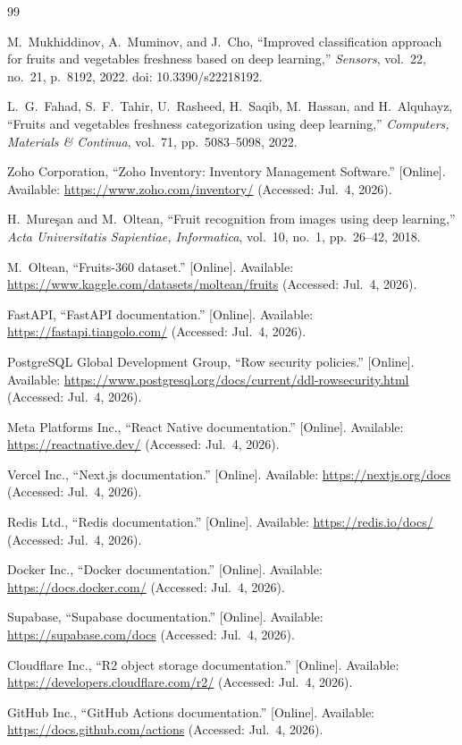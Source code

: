 \documentclass[12pt,a4paper]{article}
\begin{document}
\newpage
\begin{thebibliography}{99}

M.~Mukhiddinov, A.~Muminov, and J.~Cho, ``Improved classification approach for fruits and vegetables freshness based on deep learning,'' \emph{Sensors}, vol.~22, no.~21, p.~8192, 2022. doi: 10.3390/s22218192.

L.~G.~Fahad, S.~F.~Tahir, U.~Rasheed, H.~Saqib, M.~Hassan, and H.~Alquhayz, ``Fruits and vegetables freshness categorization using deep learning,'' \emph{Computers, Materials \& Continua}, vol.~71, pp.~5083--5098, 2022.

Zoho Corporation, ``Zoho Inventory: Inventory Management Software.'' [Online]. Available: \url{https://www.zoho.com/inventory/} (Accessed: Jul.~4, 2026).

H.~Mure\c{s}an and M.~Oltean, ``Fruit recognition from images using deep learning,'' \emph{Acta Universitatis Sapientiae, Informatica}, vol.~10, no.~1, pp.~26--42, 2018.

M.~Oltean, ``Fruits-360 dataset.'' [Online]. Available: \url{https://www.kaggle.com/datasets/moltean/fruits} (Accessed: Jul.~4, 2026).

FastAPI, ``FastAPI documentation.'' [Online]. Available: \url{https://fastapi.tiangolo.com/} (Accessed: Jul.~4, 2026).

PostgreSQL Global Development Group, ``Row security policies.'' [Online]. Available: \url{https://www.postgresql.org/docs/current/ddl-rowsecurity.html} (Accessed: Jul.~4, 2026).

Meta Platforms Inc., ``React Native documentation.'' [Online]. Available: \url{https://reactnative.dev/} (Accessed: Jul.~4, 2026).

Vercel Inc., ``Next.js documentation.'' [Online]. Available: \url{https://nextjs.org/docs} (Accessed: Jul.~4, 2026).

Redis Ltd., ``Redis documentation.'' [Online]. Available: \url{https://redis.io/docs/} (Accessed: Jul.~4, 2026).

Docker Inc., ``Docker documentation.'' [Online]. Available: \url{https://docs.docker.com/} (Accessed: Jul.~4, 2026).

Supabase, ``Supabase documentation.'' [Online]. Available: \url{https://supabase.com/docs} (Accessed: Jul.~4, 2026).

Cloudflare Inc., ``R2 object storage documentation.'' [Online]. Available: \url{https://developers.cloudflare.com/r2/} (Accessed: Jul.~4, 2026).

GitHub Inc., ``GitHub Actions documentation.'' [Online]. Available: \url{https://docs.github.com/actions} (Accessed: Jul.~4, 2026).

\end{thebibliography}
\end{document}
